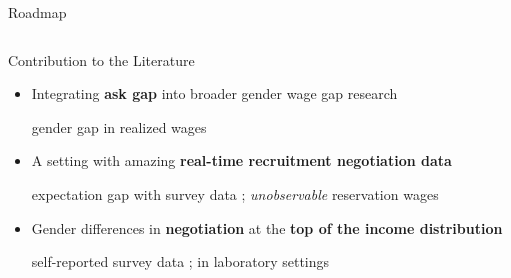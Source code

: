 \begin{frame}{Roadmap}
{\begin{columns}[T]
{\begin{column}{0.3\textwidth}
            \end{column}}

        \end{columns}
    }

    
\end{frame}

\begin{frame}{Contribution to the Literature}
    \begin{itemize}
        \item Integrating \textcolor{frenchlilac!45!white}{\textbf{ask gap}} into broader gender wage gap research
        
        {\scriptsize gender gap in realized wages \citep{blau2017gender,olivetti2016evolution}}
        \item A setting with amazing \textcolor{frenchlilac!45!white}{\textbf{real-time recruitment negotiation data}}
        
        {\scriptsize expectation gap with survey data \citep{reuben2017preferences,bergerhoff2019gender}; \textit{unobservable} reservation wages \citep{le2021gender}}
        \item Gender differences in \textcolor{frenchlilac!45!white}{\textbf{negotiation}} at the \textcolor{frenchlilac!45!white}{\textbf{top of the income distribution}}
        
        {\scriptsize self-reported survey data \citep{bertrand2018coase,goldin2014grand,garbinti2018income}; in laboratory settings \citep{babcock2003nice,bowles2005constraints,small2007goes}}
    \end{itemize}
\end{frame}

